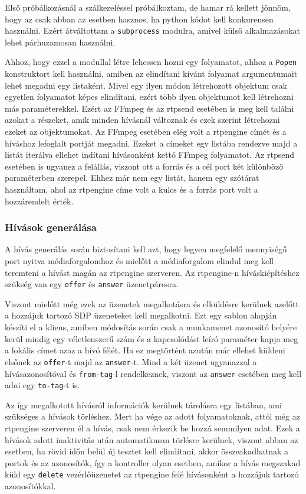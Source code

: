Első próbálkozásnál a szálkezeléssel próbálkoztam, de hamar rá kellett jönnöm,
hogy az csak abban az esetben hasznos, ha python kódot kell konkurensen 
használni. Ezért átváltottam a \texttt{subprocess} \cite{subprocess} modulra, amivel külső alkalmazásokat lehet párhuzamosan használni.

Ahhoz, hogy ezzel a modullal létre lehessen hozni egy folyamatot, ahhoz a \texttt{Popen}
konstruktort kell használni, amiben az elindítani kívánt folyamat argumentumait lehet
megadni egy listaként. Mivel egy ilyen módon létrehozott objektum csak egyetlen 
folyamatot képes elindítani, ezért több ilyen objektumot kell létrehozni más 
paraméterekkel. Ezért az FFmpeg és az rtpsend esetében is meg kell találni azokat a 
részeket, amik minden hívásnál változnak és ezek szerint létrehozni ezeket az 
objektumokat. Az FFmpeg esetében elég volt a rtpengine címét és a híváshoz lefoglalt 
portját megadni. Ezeket a címeket egy listába rendezve majd a listát iterálva ellehet 
indítani hívásonként kettő FFmpeg folyamatot. Az rtpsend esetében is ugyanez a felállás, 
viszont ott a forrás és a cél port két különböző paraméterben szerepel. Ehhez már nem egy 
listát, hanem egy szótárat használtam, ahol az rtpengine címe volt a kulcs és a forrás 
port volt a hozzárendelt érték.

\subsubsection{Hívások generálása}

A hívás generálás során biztosítani kell azt, hogy legyen megfelelő mennyiségű port
nyitva médiaforgalomhoz és mielőtt a médiaforgalom elindul meg kell teremteni a hívást
magán az rtpengine szerveren. Az rtpengine-n híváskiépítéshez szükség van egy 
\texttt{offer} és \texttt{answer} üzenetpárosra.

Viszont mielőtt még ezek az üzenetek megalkotásra és elküldésre kerülnek azelőtt
a hozzájuk tartozó SDP üzeneteket kell megalkotni. Ezt egy sablon alapján készíti el 
a kliens, amiben módosítás során csak a munkamenet azonosító helyére kerül
mindig egy véletlenszerű szám és a kapcsolódást leíró paraméter kapja meg a lokális 
címet azaz a hívó félét. Ha ez megtörtént azután már ellehet küldeni elsőnek az 
\texttt{offer}-t majd az \texttt{answer}-t. Mind a két üzenet ugyanazzal a 
hívásazonosítóval és \texttt{from-tag}-l rendelkeznek, viszont az \texttt{answer} 
esetében meg kell adni egy \texttt{to-tag}-t is.

Az így megalkotott hívásról információk kerülnek tárolásra egy listában, ami szükséges
a hívások törléshez. Mert ha vége az adott folyamatoknak, attól még az rtpengine szerveren
él a hívás, csak nem érkezik be hozzá semmilyen adat. Ezek a hívások adott inaktivitás után automatikusan törlésre kerülnek, viszont abban az esetben, ha rövid időn 
belül új tesztet kell elindítani, akkor összeakadhatnak a portok és az azonosítók, így a 
kontroller olyan esetben, amikor a hívás megszakad küld egy \texttt{delete} 
vezérlőüzenetet az rtpengine felé hívásonként a hozzájuk tartozó azonosítókkal.

